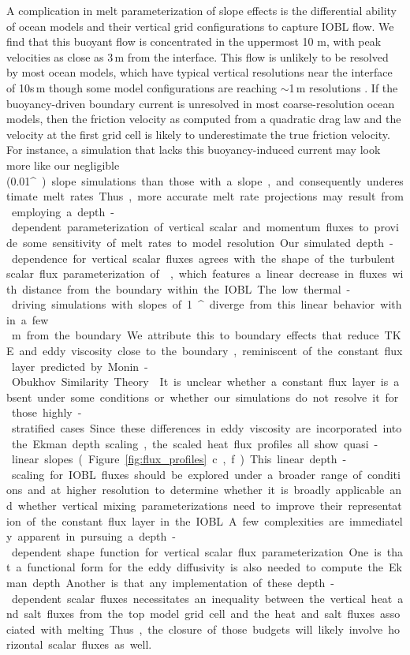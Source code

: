\documentclass[tc, manuscript]{copernicus}
\begin{document}
A complication in melt parameterization of slope effects is the differential ability of ocean models and their vertical grid configurations to capture IOBL flow. We find that this buoyant flow is concentrated in the uppermost 10 m, with peak velocities as close as 3\,\unit{m} from the interface. This flow is unlikely to be resolved by most ocean models, which have typical vertical resolutions near the interface of 10s\,\unit{m} though some model configurations are reaching $\sim\!$1\,\unit{m} resolutions \citep{gwyther_cold_2020}. If the buoyancy-driven boundary current is unresolved in most coarse-resolution ocean models, then the friction velocity as computed from a quadratic drag law and the velocity at the first grid cell is likely to underestimate the true friction velocity. For instance, a simulation that lacks this buoyancy-induced current may look more like our negligible (0.01\unit{^{\circ}}) slope simulations than those with a slope, and consequently underestimate melt rates. Thus, more accurate melt rate projections may result from employing a depth-dependent parameterization of vertical scalar and momentum fluxes to provide some sensitivity of melt rates to model resolution. 

Our simulated depth-dependence for vertical scalar fluxes agrees with the shape of the turbulent scalar flux parameterization of \citet{mcphee_dynamics_1987}, which features a linear decrease in fluxes with distance from the boundary within the IOBL. The low thermal-driving simulations with slopes of 1\unit{^{\circ}} diverge from this linear behavior within a few\,\unit{m} from the boundary. We attribute this to boundary effects that reduce TKE and eddy viscosity close to the boundary, reminiscent of the constant flux layer predicted by Monin-Obukhov Similarity Theory \citep{monin_basic_1954}. It is unclear whether a constant flux layer is absent under some conditions or whether our simulations do not resolve it for those highly-stratified cases. Since these differences in eddy viscosity are incorporated into the Ekman depth scaling, the scaled heat flux profiles all show quasi-linear slopes (Figure \ref{fig:flux_profiles}c,f). This linear depth-scaling for IOBL fluxes should be explored under a broader range of conditions and at higher resolution to determine whether it is broadly applicable and whether vertical mixing parameterizations need to improve their representation of the constant flux layer in the IOBL. 

A few complexities are immediately apparent in pursuing a depth-dependent shape function for vertical scalar flux parameterization. One is that a functional form for the eddy diffusivity is also needed to compute the Ekman depth. Another is that any implementation of these depth-dependent scalar fluxes necessitates an inequality between the vertical heat and salt fluxes from the top model grid cell and the heat and salt fluxes associated with melting. Thus, the closure of those budgets will likely involve horizontal scalar fluxes as well.
\end{document}

